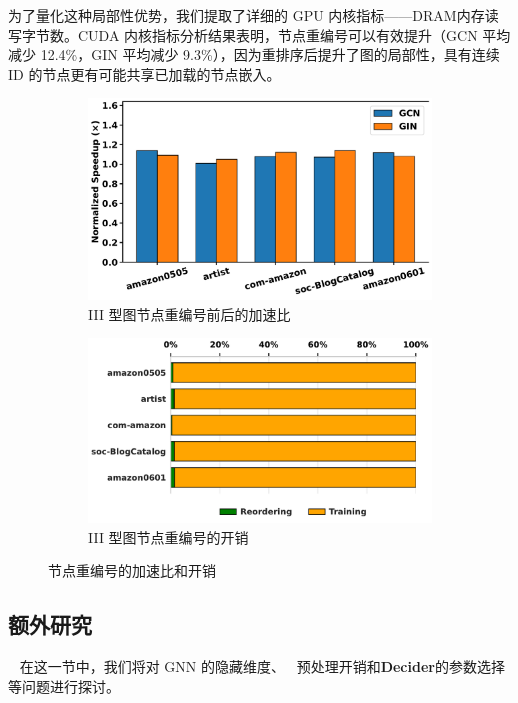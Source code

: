 为了量化这种局部性优势，我们提取了详细的 GPU 内核指标——DRAM内存读写字节数。CUDA 内核指标分析结果表明，节点重编号可以有效提升（GCN 平均减少 12.4\%，GIN 平均减少 9.3\%），因为重排序后提升了图的局部性，具有连续 ID 的节点更有可能共享已加载的节点嵌入。
\begin{figure}[htbp]
    \centering
    \begin{subfigure}[b]{0.48\textwidth}
        \centering
        \includegraphics[width=\textwidth]{images/reorder_speedup.pdf}
        \caption{III 型图节点重编号前后的加速比}
        \label{fig:reorder-speedup}
    \end{subfigure}
    \hfill
    \begin{subfigure}[b]{0.48\textwidth}
        \centering
        \includegraphics[width=\textwidth]{images/reorder_overhead.pdf}
        \caption{III 型图节点重编号的开销}
        \label{fig:reorder-overhead}
    \end{subfigure}
    \caption{节点重编号的加速比和开销}
    \label{fig:reorder}
\end{figure}


\subsection{额外研究}
~\label{sect: Additional Studies}
在这一节中，我们将对 GNN 的隐藏维度、~\Mname{} 预处理开销和\textbf{Decider}的参数选择等问题进行探讨。
